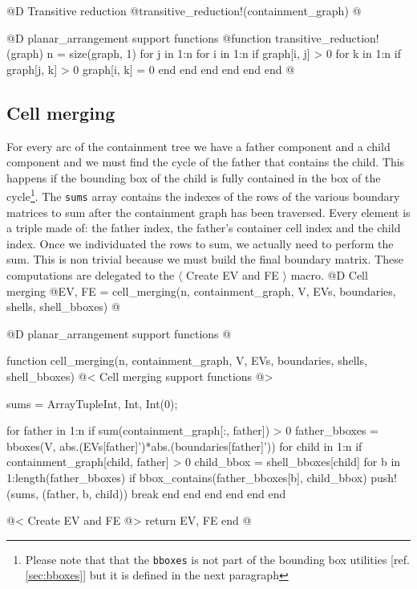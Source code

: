 @D Transitive reduction
@{transitive_reduction!(containment_graph) 
@}

@D planar\_arrangement support functions
@{function transitive_reduction!(graph)
    n = size(graph, 1)
    for j in 1:n
        for i in 1:n
            if graph[i, j] > 0
                for k in 1:n
                    if graph[j, k] > 0
                        graph[i, k] = 0
                    end
                end
            end
        end
    end
end
@}

\subsection{Cell merging}

For every arc of the containment tree we have a father component 
and a child component and we must find the cycle of the father that
contains the child. This happens if the bounding box of the child is fully
contained in the box of the cycle\footnote{Please note that
that the \texttt{bboxes} is not part of the bounding box utilities 
[ref. \ref{sec:bboxes}] but it is defined 
in the next paragraph}. The \texttt{sums} array contains the indexes of 
the rows of the various boundary matrices to sum after the containment 
graph has been traversed. Every element is a triple made of: the father 
index, the father's container cell index and the child index.
Once we individuated the rows to sum, we actually need to perform the sum.
This is non trivial because we must build the final boundary matrix.
These computations are delegated to the $\langle$ Create EV and FE $\rangle$ macro.
@D Cell merging 
@{EV, FE = cell_merging(n, containment_graph, V, EVs, boundaries, shells, shell_bboxes)
@}

@D planar\_arrangement support functions 
@{function cell_merging(n, containment_graph, V, EVs, boundaries, shells, shell_bboxes)
    @< Cell merging support functions @>

    sums = Array{Tuple{Int, Int, Int}}(0);

    for father in 1:n
        if sum(containment_graph[:, father]) > 0
            father_bboxes = bboxes(V, abs.(EVs[father]')*abs.(boundaries[father]'))
            for child in 1:n
                if containment_graph[child, father] > 0
                    child_bbox = shell_bboxes[child]
                    for b in 1:length(father_bboxes)
                        if bbox_contains(father_bboxes[b], child_bbox)
                            push!(sums, (father, b, child))
                            break
                        end
                    end
                end            
            end
        end
    end

    @< Create EV and FE @>
    return EV, FE
end
@}

